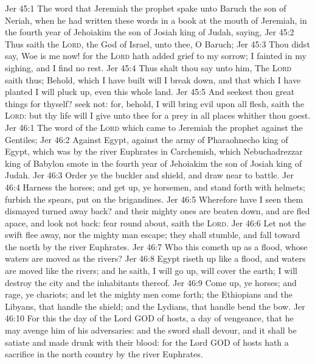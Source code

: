 \vs Jer 45:1 The word that Jeremiah the prophet spake unto Baruch the son of Neriah, when he had written these words in a book at the mouth of Jeremiah, in the fourth year of Jehoiakim the son of Josiah king of Judah, saying,
\vs Jer 45:2 Thus saith the \textsc{Lord}, the God of Israel, unto thee, O Baruch;
\vs Jer 45:3 Thou didst say, Woe is me now! for the \textsc{Lord} hath added grief to my sorrow; I fainted in my sighing, and I find no rest.
\vs Jer 45:4 Thus shalt thou say unto him, The \textsc{Lord} saith thus; Behold,  which I have built will I break down, and that which I have planted I will pluck up, even this whole land.
\vs Jer 45:5 And seekest thou great things for thyself? seek  not: for, behold, I will bring evil upon all flesh, saith the \textsc{Lord}: but thy life will I give unto thee for a prey in all places whither thou goest.
\vs Jer 46:1 The word of the \textsc{Lord} which came to Jeremiah the prophet against the Gentiles;
\vs Jer 46:2 Against Egypt, against the army of Pharaohnecho king of Egypt, which was by the river Euphrates in Carchemish, which Nebuchadrezzar king of Babylon smote in the fourth year of Jehoiakim the son of Josiah king of Judah.
\vs Jer 46:3 Order ye the buckler and shield, and draw near to battle.
\vs Jer 46:4 Harness the horses; and get up, ye horsemen, and stand forth with  helmets; furbish the spears,  put on the brigandines.
\vs Jer 46:5 Wherefore have I seen them dismayed  turned away back? and their mighty ones are beaten down, and are fled apace, and look not back:  fear  round about, saith the \textsc{Lord}.
\vs Jer 46:6 Let not the swift flee away, nor the mighty man escape; they shall stumble, and fall toward the north by the river Euphrates.
\vs Jer 46:7 Who  this  cometh up as a flood, whose waters are moved as the rivers?
\vs Jer 46:8 Egypt riseth up like a flood, and  waters are moved like the rivers; and he saith, I will go up,  will cover the earth; I will destroy the city and the inhabitants thereof.
\vs Jer 46:9 Come up, ye horses; and rage, ye chariots; and let the mighty men come forth; the Ethiopians and the Libyans, that handle the shield; and the Lydians, that handle  bend the bow.
\vs Jer 46:10 For this  the day of the Lord GOD of hosts, a day of vengeance, that he may avenge him of his adversaries: and the sword shall devour, and it shall be satiate and made drunk with their blood: for the Lord GOD of hosts hath a sacrifice in the north country by the river Euphrates.
